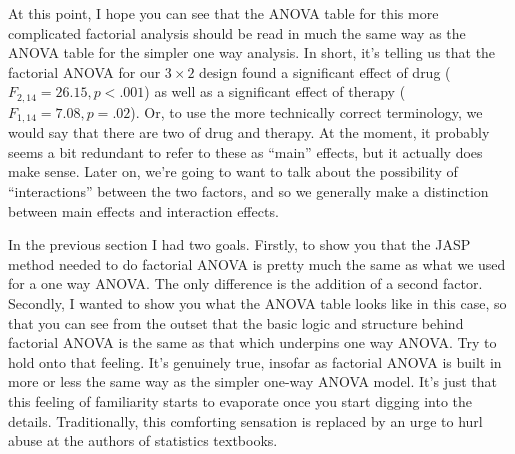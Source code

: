 At this point, I hope you can see that the ANOVA table for this more complicated factorial analysis should be read in much the same way as the ANOVA table for the simpler one way analysis. In short, it's telling us that the factorial ANOVA for our $3 \times 2$ design found a significant effect of drug ($F_{2,14} = 26.15, p < .001$) as well as a significant effect of therapy ($F_{1,14} = 7.08, p = .02$). Or, to use the more technically correct terminology, we would say that there are two  of drug and therapy. At the moment, it probably seems a bit redundant to refer to these as ``main'' effects, but it actually does make sense. Later on, we're going to want to talk about the possibility of ``interactions'' between the two factors, and so we generally make a distinction between main effects and interaction effects. 


In the previous section I had two goals. Firstly, to show you that the JASP method needed to do factorial ANOVA is pretty much the same as what we used for a one way ANOVA. The only difference is the addition of a second factor. Secondly, I wanted to show you what the ANOVA table looks like in this case, so that you can see from the outset that the basic logic and structure behind factorial ANOVA is the same as that which underpins one way ANOVA. Try to hold onto that feeling. It's genuinely true, insofar as factorial ANOVA is built in more or less the same way as the simpler one-way ANOVA model. It's just that this feeling of familiarity starts to evaporate once you start digging into the details. Traditionally, this comforting sensation is replaced by an urge to hurl abuse at the authors of statistics textbooks.

